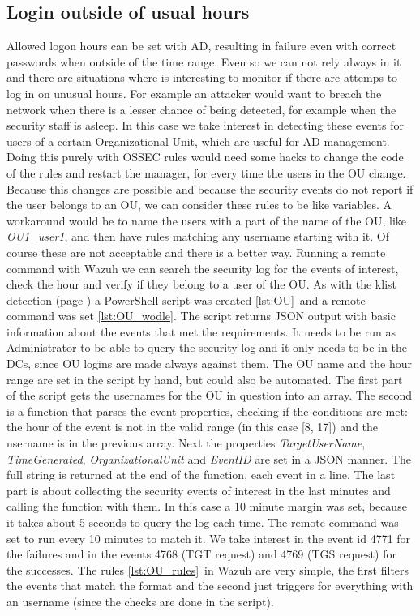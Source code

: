 \subsection{Login outside of usual hours}
Allowed logon hours can be set with AD, resulting in failure even with correct passwords when outside of the time range.
Even so we can not rely always in it and there are situations where is interesting to monitor if there are attemps to log in on unusual hours.
For example an attacker would want to breach the network when there is a lesser chance of being detected, for example when the security staff is asleep.
In this case we take interest in detecting these events for users of a certain Organizational Unit, which are useful for AD management.
\linej
\linej
Doing this purely with OSSEC rules would need some hacks to change the code of the rules and restart the manager, for every time the users in the OU change.
Because this changes are possible and because the security events do not report if the user belongs to an OU, we can consider these rules to be like variables.
A workaround would be to name the users with a part of the name of the OU, like \textit{OU1\_user1}, and then have rules matching any username starting with it.
\linej
\linej
Of course these are not acceptable and there is a better way.
Running a remote command with Wazuh we can search the security log for the events of interest, check the hour and verify if they belong to a user of the OU.
As with the klist detection (page \pageref{klist_detection}) a PowerShell script was created \ref{lst:OU}\ and a remote command was set \ref{lst:OU_wodle}.
The script returns JSON output with basic information about the events that met the requirements.
It needs to be run as Administrator to be able to query the security log and it only needs to be in the DCs, since OU logins are made always against them.
The OU name and the hour range are set in the script by hand, but could also be automated.
\linej
\linej
The first part of the script gets the usernames for the OU in question into an array.
\linej
The second is a function that parses the event properties, checking if the conditions are met: the hour of the event is not in the valid range (in this case [8, 17]) and the username is in the previous array.
Next the properties \textit{TargetUserName}, \textit{TimeGenerated}, \textit{OrganizationalUnit} and \textit{EventID} are set in a JSON manner.
The full string is returned at the end of the function, each event in a line.
\linej
The last part is about collecting the security events of interest in the last minutes and calling the function with them. In this case a 10 minute margin was set, because it takes about 5 seconds to query the log each time. The remote command was set to run every 10 minutes to match it.
\linej
We take interest in the event id 4771 for the failures and in the events 4768 (TGT request) and 4769 (TGS request) for the successes\cite{windows_events}.
\linej
\linej
The rules \ref{lst:OU_rules}\ in Wazuh are very simple, the first filters the events that match the format and the second just triggers for everything with an username (since the checks are done in the script).

